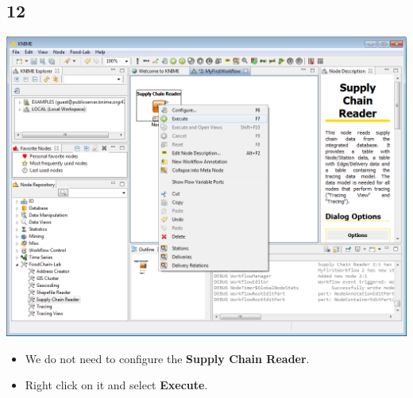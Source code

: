 \documentclass{beamer}
\begin{document}
\subsection{12}
\begin{frame}
	\begin{center}
  		\includegraphics[height=0.6\textheight]{12.png}
	\end{center}
	\begin{itemize}
		\item We do not need to configure the \textbf{Supply Chain Reader}.
		\item Right click on it and select \textbf{Execute}.
	\end{itemize}
\end{frame}
\end{document}

